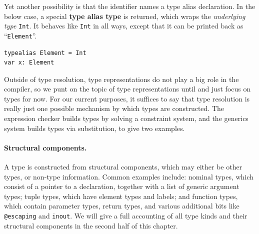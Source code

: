 \documentclass[../generics]{subfiles}
\begin{document}
\medskip

\begin{figure}
\end{figure}

Yet another possibility is that the identifier names a type alias declaration. In the below case, a special \textbf{type alias type} is returned, which wraps the \emph{underlying type} \texttt{Int}. It behaves like \texttt{Int} in all ways, except that it can be printed back as ``\texttt{Element}''.

\medskip
\noindent
\begin{minipage}{29em}
\begin{Verbatim}
typealias Element = Int
var x: Element
\end{Verbatim}
\end{minipage}
\medskip

Outside of type resolution, type representations do not play a big role in the compiler, so we punt on the topic of type representations until  and just focus on types for now. For our current purposes, it suffices to say that type resolution is really just one possible mechanism by which types are constructed. The expression checker builds types by solving a constraint system, and the generics system builds types via substitution, to give two examples.

\paragraph{Structural components.} A type is constructed from structural components, which may either be other types, or non-type information. Common examples include: nominal types, which consist of a pointer to a declaration, together with a list of generic argument types; tuple types, which have element types and labels; and function types, which contain parameter types, return types, and various additional bits like \texttt{@escaping} and \texttt{inout}.  We will give a full accounting of all type kinds and their structural components in the second half of this chapter.
\end{document}

